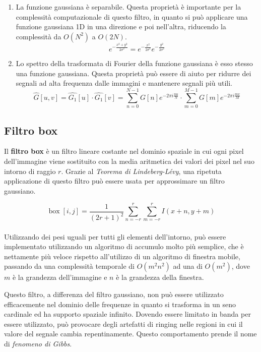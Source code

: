 \documentclass[../main.tex]{subfiles}
\begin{document}
\begin{enumerate}
	\item La funzione gaussiana è separabile. Questa proprietà è importante per la complessità computazionale di questo filtro, in quanto si può applicare una funzione gaussiana 1D in una direzione e poi nell'altra, riducendo la complessità da $O(N^2)$ a $O(2N)$.
	\begin{equation}
		e^{-\frac{x^2+y^2}{2\sigma^2}}=e^{-\frac{x^2}{2\sigma^2}}e^{-\frac{y^2}{2\sigma^2}}
	\end{equation}
	\item Lo spettro della trasformata di Fourier della funzione gaussiana è esso stesso una funzione gaussiana. Questa proprietà può essere di aiuto per ridurre dei segnali ad alta frequenza dalle immagini e mantenere segnali più utili.
	\begin{equation}
		\hat{G}[u,v] = \hat{G_1}[u]\cdot\hat{G_1}[v] = \sum_{n=0}^{N-1}G[n]e^{-2\pi i\frac{nu}{N}}\cdot\sum_{m=0}^{M-1}G[m]e^{-2\pi i\frac{mv}{M}}
	\end{equation}
\end{enumerate}

\subsection{Filtro box}

Il \textbf{filtro box} è un filtro lineare costante nel dominio spaziale in cui ogni pixel dell'immagine viene sostituito con la media aritmetica dei valori dei pixel nel suo intorno di raggio $r$. Grazie al \textit{Teorema di Lindeberg-Lévy}, una ripetuta applicazione di questo filtro può essere usata per approssimare un filtro gaussiano.\cite{getreuer_2013}

\begin{equation}
	\operatorname{box}[i,j] = \frac{1}{(2r+1)^2}\sum_{n=-r}^{r}\sum_{m=-r}^{r} I(x+n, y+m)
\end{equation}
\\[-10pt]
Utilizzando dei pesi uguali per tutti gli elementi dell'intorno, può essere implementato utilizzando un algoritmo di accumulo molto più semplice, che è nettamente più veloce rispetto all'utilizzo di un algoritmo di finestra mobile, passando da una complessità temporale di $O(m^2n^2)$ ad una di $O(m^2)$, dove $m$ è la grandezza dell'immagine e $n$ è la grandezza della finestra.\cite{jarosz_2001}

Questo filtro, a differenza del filtro gaussiano, non può essere utilizzato efficacemente nel dominio delle frequenze in quanto si trasforma in un seno cardinale ed ha supporto spaziale infinito. Dovendo essere limitato in banda per essere utilizzato, può provocare degli artefatti di ringing nelle regioni in cui il valore del segnale cambia repentinamente. Questo comportamento prende il nome di \textit{fenomeno di Gibbs}.\cite{carslaw_1925}\\
\end{document}
